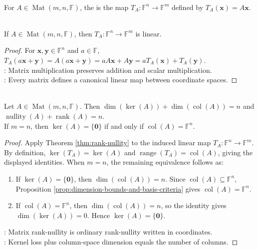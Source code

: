 \begin{definition} \\
For $A\in\operatorname{Mat}(m,n,\mathbb{F})$, the  is the map $T_A:\mathbb{F}^n\to\mathbb{F}^m$ defined by $T_A(\mathbf{x})=A\mathbf{x}$.
\end{definition}

\begin{proposition} \label{prop:matrix-induced-map-linear} \\
If $A\in\operatorname{Mat}(m,n,\mathbb{F})$, then $T_A:\mathbb{F}^n\to\mathbb{F}^m$ is linear.
\begin{proof}
For $\mathbf{x},\mathbf{y}\in\mathbb{F}^n$ and $a\in\mathbb{F}$, $T_A(a\mathbf{x}+\mathbf{y})=A(a\mathbf{x}+\mathbf{y})=aA\mathbf{x}+A\mathbf{y}=aT_A(\mathbf{x})+T_A(\mathbf{y})$.\\
: Matrix multiplication preserves addition and scalar multiplication.\\
: Every matrix defines a canonical linear map between coordinate spaces.
\end{proof}
\end{proposition}

\begin{corollary} \label{cor:matrix-rank-nullity} \\
Let $A\in\operatorname{Mat}(m,n,\mathbb{F})$. Then $\dim(\ker(A))+\dim(\operatorname{col}(A))=n$ and $\operatorname{nullity}(A)+\operatorname{rank}(A)=n$.\\
If $m=n$, then $\ker(A)=\{\mathbf{0}\}$ if and only if $\operatorname{col}(A)=\mathbb{F}^n$.
\begin{proof}
Apply Theorem \ref{thm:rank-nullity} to the induced linear map $T_A:\mathbb{F}^n\to\mathbb{F}^m$. By definition, $\ker(T_A)=\ker(A)$ and $\operatorname{range}(T_A)=\operatorname{col}(A)$, giving the displayed identities. When $m=n$, the remaining equivalence follows as:
\begin{enumerate}[label=\roman*.]
\setlength{\itemsep}{0pt}
\item[$(\Rightarrow)$] If $\ker(A)=\{\mathbf{0}\}$, then $\dim(\operatorname{col}(A))=n$. Since $\operatorname{col}(A)\subseteq\mathbb{F}^n$, Proposition \ref{prop:dimension-bounds-and-basis-criteria} gives $\operatorname{col}(A)=\mathbb{F}^n$.
\item[$(\Leftarrow)$] If $\operatorname{col}(A)=\mathbb{F}^n$, then $\dim(\operatorname{col}(A))=n$, so the identity gives $\dim(\ker(A))=0$. Hence $\ker(A)=\{\mathbf{0}\}$.
\end{enumerate}
: Matrix rank-nullity is ordinary rank-nullity written in coordinates.\\
: Kernel loss plus column-space dimension equals the number of columns.
\end{proof}
\end{corollary}

